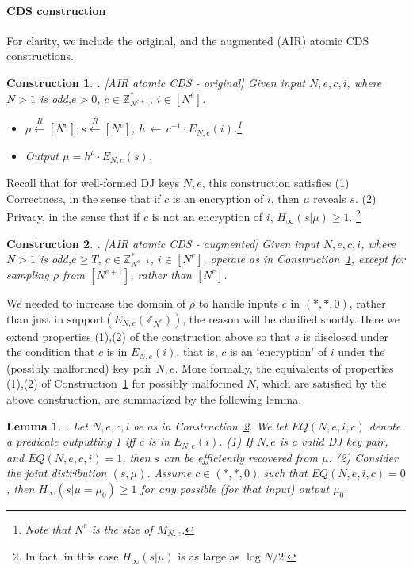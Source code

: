 \documentclass[11pt]{article}
\newcommand{\encr}[2]{E_{#1}(#2)}
\newcommand{\encdj}{{E}_{N,e}}
\newcommand{\support}{{\mathrm{support}}}
\newcommand{\plain}{{{M}}}
\newcommand{\plaintext}[1]{\plain_{#1}}
\newcommand{\Z}{{\mathbb{Z}}}
\newtheorem{LEMMA}{Lemma}[section]
\newenvironment{lemma}{\begin{LEMMA} \hspace{-.85em} {\bf .} \rm}%
	{\end{LEMMA}}
\newtheorem{CONSTRUCTION}{Construction}[section]
\newenvironment{construction}{\begin{CONSTRUCTION} \hspace{-.85em} {\bf .} \rm}%
	{\end{CONSTRUCTION}}
\newcommand{\from}{{\,\leftarrow\,}}
\newcommand{\samp}[2]{#1\from #2}
\newcommand{\usamp}[2]{#1\stackrel{R}{\leftarrow}#2}
\newcommand{\U}[1]{\mathbb{Z}_{#1}^*}
\begin{document}
\paragraph{CDS construction}
For clarity, we include the original, and the augmented (AIR) atomic CDS constructions.
\begin{construction}[AIR atomic CDS - original]
\label{con-air-cds-orig}
Given input $N,e,c,i$, where $N>1$ is odd,$e>0$, $c\in \U{N^{e+1}}$, $i\in [N^e]$.
\begin{itemize}
  \item $\usamp{\rho}{[N^e]};\usamp{s}{[N^e]}$, $\samp{h}{c^{-1}\cdot \encr{N,e}{i}}$.\footnote{Note that $N^e$
    is the size of $\plaintext{N,e}$.}
    \item Output $\mu=h^{\rho}\cdot\encr{N,e}{s}$.
  \end{itemize}
\end{construction}
Recall that for well-formed DJ keys $N,e$, this construction satisfies (1) Correctness, in the sense that if $c$ is an encryption
of $i$, then $\mu$ reveals $s$. (2) Privacy, in the sense that if $c$ is not an encryption of $i$, $H_\infty(s|\mu)\geq 1$. \footnote{In fact, in this case $H_\infty(s|\mu)$ is as large as $\log{N}/2$.}
\begin{construction}[AIR atomic CDS - augmented]
  \label{con-air-cds-aug}
  Given input $N,e,c,i$, where $N>1$ is odd,$e\geq T$, $c\in \U{N^{e+1}}$, $i\in [N^e]$,
  operate as in Construction~\ref{con-air-cds-orig}, except for sampling $\rho$ from $[N^{e+1}]$,
  rather than $[N^e]$.
\end{construction}
We needed to increase the domain of $\rho$ to handle inputs $c$ in
$(*,*,0)$, rather than just in $\support(\encdj(\Z_{N^e}))$, the
reason will be clarified shortly. Here we extend properties (1),(2) of the construction above so that
$s$ is disclosed under the condition that $c$ is in $\encdj(i)$, that is,
$c$ is an `encryption' of $i$ under the (possibly malformed) key
pair $N,e$. More formally, the equivalents of properties (1),(2) of Construction~\ref{con-air-cds-orig} 
for possibly malformed $N$, which are satisfied by the above
construction, are summarized by the following lemma.
\begin{lemma}
  \label{lem-air-cds-priv}
  Let $N,e,c,i$ be as in Construction~\ref{con-air-cds-aug}. We
  let $EQ(N,e,i,c)$ denote a predicate outputting 1 iff $c$ is in $\encdj(i)$.
  (1) If $N,e$ is a valid DJ key pair, and $EQ(N,e,c,i)=1$, then $s$ can be efficiently recovered from $\mu$.
  (2) Consider the joint distribution $(s,\mu)$. Assume $c\in (*,*,0)$ such that $EQ(N,e,i,c)=0$,
  then $H_{\infty}(s|\mu=\mu_0) \geq 1$ for any possible (for that input) output $\mu_0$.
\end{lemma}
\end{document}
